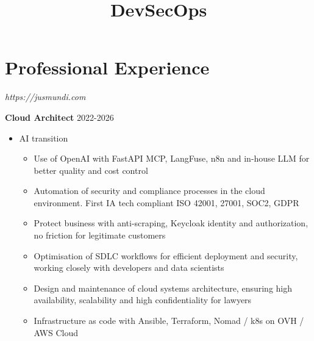 \documentclass[11pt,a4paper]{moderncv}
\title{DevSecOps}
\begin{document}
\makecvtitle

\section{Professional Experience}

{
\textit{https://jusmundi.com}
\bigskip

\textbf{Cloud Architect} \hfill 2022-2026
	\begin{itemize}%
		\item AI transition
			\begin{itemize}%
				\item Use of OpenAI with FastAPI MCP, LangFuse, n8n and in-house LLM for better quality and cost control
				\item Automation of security and compliance processes in the cloud environment. First IA tech compliant ISO 42001, 27001, SOC2, GDPR
				\item Protect business with anti-scraping, Keycloak identity and authorization, no friction for legitimate customers
				\item Optimisation of SDLC workflows for efficient deployment and security, working closely with developers and data scientists
				\item Design and maintenance of cloud systems architecture, ensuring high availability, scalability and high confidentiality for lawyers
				\item Infrastructure as code with Ansible, Terraform, Nomad / k8s on OVH / AWS Cloud
			\end{itemize}
	\end{itemize}
}
\bigskip
{}
\end{document}
